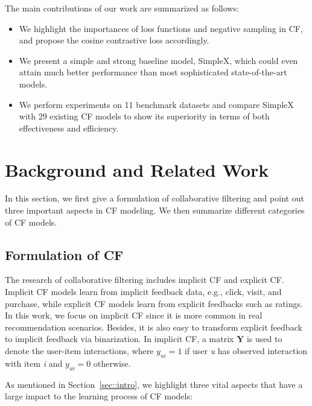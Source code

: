 \documentclass[sigconf,authorversion]{acmart}
\begin{document}
The main contributions of our work are summarized as follows:
\begin{itemize}
    \item We highlight the importances of loss functions and negative sampling in CF, and propose the cosine contrastive loss accordingly.
   
    \item We present a simple and strong baseline model, SimpleX, which could even attain much better performance than most sophisticated state-of-the-art models.
    
    \item We perform experiments on 11 benchmark datasets and compare SimpleX with 29 existing CF models to show its superiority in terms of both effectiveness and efficiency. 
\end{itemize}


















%
 \section{Background and Related Work}\label{sec:cf}

In this section, we first give a formulation of collaborative filtering  and point out three important aspects in CF modeling. We then summarize different categories of CF models.

\subsection{Formulation of CF}
The research of collaborative filtering includes implicit CF and explicit CF. Implicit CF models learn from implicit feedback data, e.g., click, visit, and purchase, while explicit CF models learn from explicit feedbacks such as ratings. 
In this work, we focus on implicit CF since it is more common in real recommendation scenarios. 
Besides, it is also easy to transform explicit feedback to implicit feedback via binarization. 
In implicit CF, a matrix $\mathbf{Y}$ is used to denote the user-item interactions, where $y_{ui}=1$ if user \textit{u} has observed interaction with item \textit{i} and $y_{ui}=0$ otherwise.

As mentioned in Section~\ref{sec::intro}, 
we highlight three vital aspects that have a large impact to the learning process of CF models:
\end{document}
